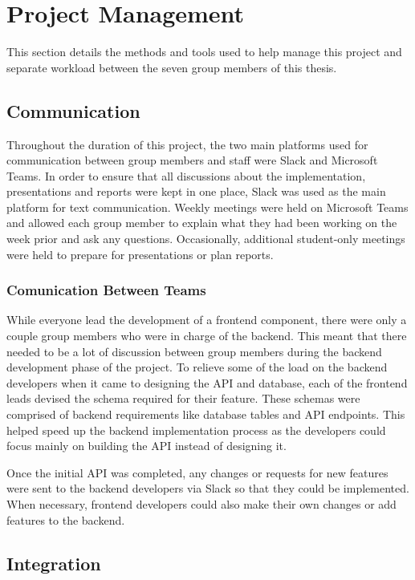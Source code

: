\section{Project Management}

This section details the methods and tools used to help manage this project and separate workload between the seven group members of this thesis.

\subsection{Communication}

Throughout the duration of this project, the two main platforms used for communication between group members and staff were Slack and Microsoft Teams.
In order to ensure that all discussions about the implementation, presentations and reports were kept in one place, Slack was used as the main platform for text communication.
Weekly meetings were held on Microsoft Teams and allowed each group member to explain what they had been working on the week prior and ask any questions.
Occasionally, additional student-only meetings were held to prepare for presentations or plan reports.

\subsubsection{Comunication Between Teams}

While everyone lead the development of a frontend component, there were only a couple group members who were in charge of the backend.
This meant that there needed to be a lot of discussion between group members during the backend development phase of the project.
To relieve some of the load on the backend developers when it came to designing the API and database, each of the frontend leads devised the schema required for their feature.
These schemas were comprised of backend requirements like database tables and API endpoints.
This helped speed up the backend implementation process as the developers could focus mainly on building the API instead of designing it.

Once the initial API was completed, any changes or requests for new features were sent to the backend developers via Slack so that they could be implemented.
When necessary, frontend developers could also make their own changes or add features to the backend.

\subsection{Integration}

